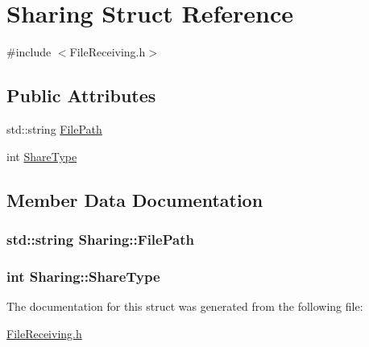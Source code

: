 \hypertarget{structSharing}{\section{Sharing Struct Reference}
\label{structSharing}
}


{\ttfamily \#include $<$File\-Receiving.\-h$>$}

\subsection*{Public Attributes}
\begin{DoxyCompactItemize}
\item 
std\-::string \hyperlink{structSharing_a05c2780c111c85ad36c3afcbc7d011bc}{File\-Path}
\item 
int \hyperlink{structSharing_adf1e4a441806d9b5b441a2db05511ab5}{Share\-Type}
\end{DoxyCompactItemize}


\subsection{Member Data Documentation}
\hypertarget{structSharing_a05c2780c111c85ad36c3afcbc7d011bc}{
\subsubsection[{File\-Path}]{\setlength{\rightskip}{0pt plus 5cm}std\-::string Sharing\-::\-File\-Path}}\label{structSharing_a05c2780c111c85ad36c3afcbc7d011bc}
\hypertarget{structSharing_adf1e4a441806d9b5b441a2db05511ab5}{
\subsubsection[{Share\-Type}]{\setlength{\rightskip}{0pt plus 5cm}int Sharing\-::\-Share\-Type}}\label{structSharing_adf1e4a441806d9b5b441a2db05511ab5}


The documentation for this struct was generated from the following file\-:\begin{DoxyCompactItemize}
\item 
\hyperlink{FileReceiving_8h}{File\-Receiving.\-h}\end{DoxyCompactItemize}
